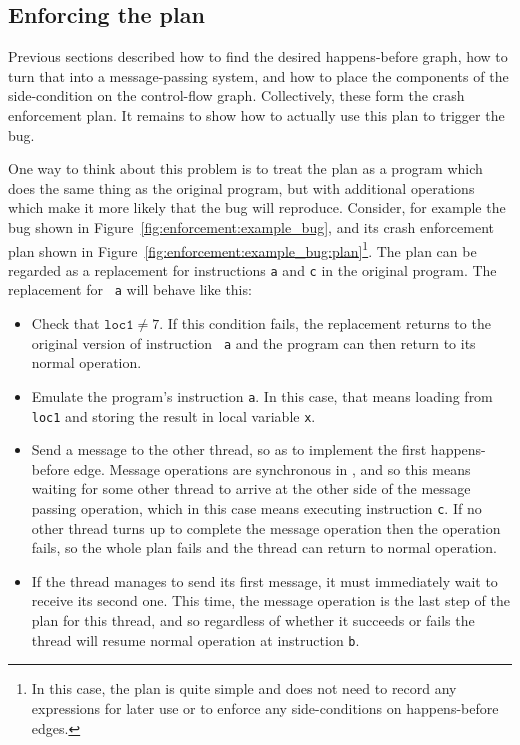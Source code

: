 
\subsection{Enforcing the plan}

Previous sections described how to find the desired happens-before
graph, how to turn that into a message-passing system, and how to
place the components of the side-condition on the control-flow graph.
Collectively, these form the crash enforcement plan.  It remains to
show how to actually use this plan to trigger the bug.

One way to think about this problem is to treat the plan as a program
which does the same thing as the original program, but with additional
operations which make it more likely that the bug will reproduce.
Consider, for example the bug shown in
Figure~\ref{fig:enforcement:example_bug}, and its crash enforcement
plan shown in
Figure~\ref{fig:enforcement:example_bug:plan}\footnote{In this case,
  the plan is quite simple and does not need to record any expressions
  for later use or to enforce any side-conditions on happens-before
  edges.}.  The plan can be regarded as a replacement for instructions
{\tt a} and {\tt c} in the original program.  The replacement for {\tt
  a} will behave like this:

\begin{itemize}
\item Check that $\mathtt{loc1} \not= 7$.  If this condition fails,
  the replacement returns to the original version of instruction {\tt
    a} and the program can then return to its normal operation.
\item Emulate the program's instruction {\tt a}.  In this case, that
  means loading from {\tt loc1} and storing the result in local
  variable {\tt x}.
\item Send a message to the other thread, so as to implement the first
  happens-before edge.  Message operations are synchronous in
  {\implementation}, and so this means waiting for some other thread
  to arrive at the other side of the message passing operation, which
  in this case means executing instruction {\tt c}.  If no other
  thread turns up to complete the message operation then the operation
  fails, so the whole plan fails and the thread can return to normal
  operation.
\item If the thread manages to send its first message, it must
  immediately wait to receive its second one.  This time, the message
  operation is the last step of the plan for this thread, and so
  regardless of whether it succeeds or fails the thread will resume
  normal operation at instruction {\tt b}.
\end{itemize}


